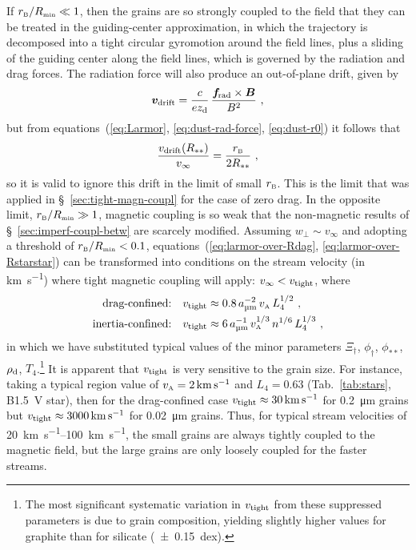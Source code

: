 If \(r_{\scriptscriptstyle\text{B}} / R_{\scriptscriptstyle\text{min}} \ll 1\), then the grains are so strongly coupled to the
field that they can be treated in the guiding-center approximation, in
which the trajectory is decomposed into a tight circular gyromotion
around the field lines, plus a sliding of the guiding center along the
field lines, which is governed by the radiation and drag forces.  The
radiation force will also produce an out-of-plane drift, given by
\begin{equation}
  \label{eq:perpendicular-drift}
  \bm{v}_{\text{drift}} = \frac{c}{e z_{\text{d}}} \, \frac{\bm{f}\!_{\text{rad}} \times \bm{B}}{B^2}
  \ ,
\end{equation}
but from equations~(\ref{eq:Larmor}, \ref{eq:dust-rad-force},
\ref{eq:dust-r0}) it follows that
\begin{equation}
  \label{eq:vdrift-over-vinfinity}
  \frac{v_{\text{drift}}(R_{**})}{v_\infty} = \frac{r_{\scriptscriptstyle\text{B}}}{2 R_{**}} \ ,
\end{equation}
so it is valid to ignore this drift in the limit of small \(r_{\scriptscriptstyle\text{B}}\).
This is the limit that was applied in \S~\ref{sec:tight-magn-coupl}
for the case of zero drag.  In the opposite limit,
\(r_{\scriptscriptstyle\text{B}} / R_{\scriptscriptstyle\text{min}} \gg 1\), magnetic coupling is so weak that the
non-magnetic results of \S~\ref{sec:imperf-coupl-betw} are scarcely
modified.  Assuming \(w_\perp \sim v_\infty\) and adopting a threshold of
\(r_{\scriptscriptstyle\text{B}} / R_{\scriptscriptstyle\text{min}} < 0.1\), equations~(\ref{eq:larmor-over-Rdag},
\ref{eq:larmor-over-Rstarstar}) can be transformed into conditions on
the stream velocity (in \si{km.s^{-1}}) where tight magnetic coupling
will apply: \(v_{\infty} < v_{\text{tight}}\), where
\begin{equation}
  \label{eq:velocity-strong-B-coupling}
  \begin{aligned}
    \text{drag-confined:}\quad v\freeze
    &\approx 0.8 \, a_{\si{\um}}^{-2} \, v\alfven \, L_4^{1/2} \ , \\
    \text{inertia-confined:}\quad v\freeze
    &\approx 6 \, a_{\si{\um}}^{-1} \, v\alfven^{1/3} \, n^{1/6} \, L_4^{1/3} \ ,
  \end{aligned}
\end{equation}
in which we have substituted typical values of the minor parameters
\(\Xi_\dag\), \(\phi_{\dag}\), \(\phi_{**}\), \(\rho_{\text{d}}\),
\(T_4\).\footnote{%
  The most significant systematic variation in \(v_{\text{tight}}\) from these
  suppressed parameters is due to grain composition, yielding slightly
  higher values for graphite than for silicate (\SI{+-0.15}{dex}).} %
It is apparent that \(v_{\text{tight}}\) is very sensitive to the grain size.
For instance, taking a typical \hii{} region value of
\(v_{\scriptscriptstyle\text{A}} = \SI{2}{km.s^{-1}}\) \citep{Arthur:2011a} and
\(L_4 = 0.63\) (Tab.~\ref{tab:stars}, B1.5~V star), then for the
drag-confined case \(v_{\text{tight}} \approx \SI{30}{km.s^{-1}}\) for \SI{0.2}{\um}
grains but \(v_{\text{tight}} \approx \SI{3000}{km.s^{-1}}\) for \SI{0.02}{\um}
grains. Thus, for typical stream velocities of
\SIrange{20}{100}{km.s^{-1}}, the small grains are always tightly
coupled to the magnetic field, but the large grains are only loosely
coupled for the faster streams.


